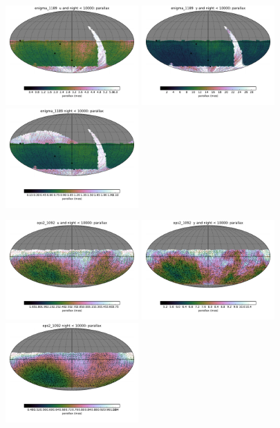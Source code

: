\begin{figure}[ht]
  \begin{center}
  \includegraphics[width=2.0in]{./figs/milkyway/MW_Astrom_paError_1189_u_map.pdf}
  \includegraphics[width=2.0in]{./figs/milkyway/MW_Astrom_paError_1189_y_map.pdf}
  \includegraphics[width=2.0in]{./figs/milkyway/MW_Astrom_paError_1189_10y_map.pdf}
  \end{center}
  \begin{center}
  \includegraphics[width=2.0in]{./figs/milkyway/MW_Astrom_paError_1092_u_map.pdf}
  \includegraphics[width=2.0in]{./figs/milkyway/MW_Astrom_paError_1092_y_map.pdf}
  \includegraphics[width=2.0in]{./figs/milkyway/MW_Astrom_paError_1092_10y_map.pdf}
  \end{center}


\end{figure}
